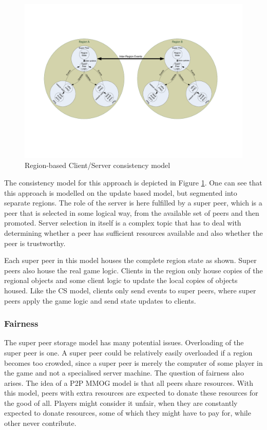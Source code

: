 \documentclass[10pt,a4paper,journal,cspaper,compsoc]{IEEEtran}
\begin{document}
\begin{figure}[htbp]
 \centering
 \includegraphics[clip=true, viewport=2cm 5cm 27cm 16.5cm, width=\textwidth]{region_based_CS_CM}
 \caption{Region-based Client/Server consistency model}
 \label{fig_cs_region_cm}
\end{figure}
%
The consistency model for this approach is depicted in Figure \ref{fig_cs_region_cm}. One can see that this approach is modelled on the update based
model, but segmented into separate regions. The role of the server is here fulfilled by a super peer, which is a peer that is selected in some
logical way, from the available set of peers and then promoted. Server selection in itself is a complex topic that has to deal with determining
whether a peer has sufficient resources available and also whether the peer is trustworthy.

Each super peer in this model houses the complete region state as shown. Super peers also house the real game logic. Clients in the region only house
copies of the regional objects and some client logic to update the local copies of objects housed. Like the \ac{CS} model, clients only send events
to super peers, where super peers apply the game logic and send state updates to clients.

\subsubsection{Fairness}
The super peer storage model has many potential issues. Overloading of the super peer is one. A super peer could be relatively easily overloaded if a
region becomes too crowded, since a super peer is merely the computer of some player in the game and not a specialised server machine. The question
of fairness also arises. The idea of a P2P MMOG model is that all peers share resources. With this model, peers with extra resources are expected to
donate these resources for the good of all. Players might consider it unfair, when they are constantly expected to donate resources, some of which
they might have to pay for, while other never contribute.
\end{document}
